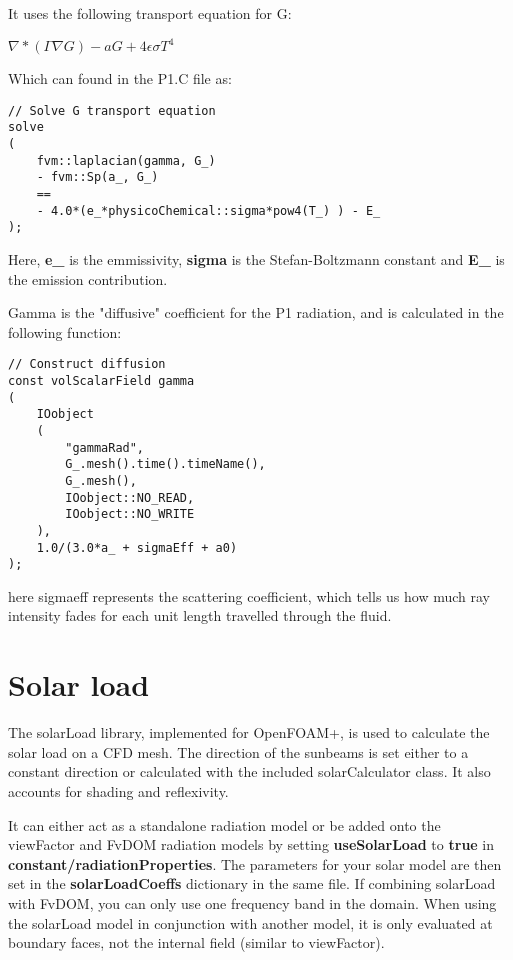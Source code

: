 It uses the following transport equation for G:

$\nabla * (\Gamma \nabla G) - aG + 4\epsilon \sigma T^4$

Which can found in the P1.C file as:

\begin{verbatim}
// Solve G transport equation
solve
(
    fvm::laplacian(gamma, G_)
    - fvm::Sp(a_, G_)
    ==
    - 4.0*(e_*physicoChemical::sigma*pow4(T_) ) - E_
);
\end{verbatim}

Here, \textbf{e\_} is the emmissivity, \textbf{sigma} is the Stefan-Boltzmann constant and \textbf{E\_} is the emission contribution.

Gamma is the "diffusive" coefficient for the P1 radiation, and is calculated in the following function:

\begin{verbatim}
// Construct diffusion
const volScalarField gamma
(
    IOobject
    (
        "gammaRad",
        G_.mesh().time().timeName(),
        G_.mesh(),
        IOobject::NO_READ,
        IOobject::NO_WRITE
    ),
    1.0/(3.0*a_ + sigmaEff + a0)
);
\end{verbatim}

here sigmaeff represents the scattering coefficient, which tells us how much ray intensity fades for each unit length travelled through the fluid.

\section{Solar load}

The solarLoad library, implemented for OpenFOAM+, is used to calculate the solar load on a CFD mesh. The direction of the sunbeams is set either to a constant direction or calculated with the included solarCalculator class. It also accounts for shading and reflexivity.

It can either act as a standalone radiation model or be added onto the viewFactor and FvDOM radiation models by setting \textbf{useSolarLoad} to \textbf{true} in \textbf{constant/radiationProperties}. The parameters for your solar model are then set in the \textbf{solarLoadCoeffs} dictionary in the same file. If combining solarLoad with FvDOM, you can only use one frequency band in the domain. When using the solarLoad model in conjunction with another model, it is only evaluated at boundary faces, not the internal field (similar to viewFactor).

